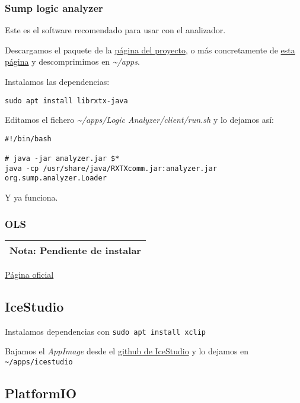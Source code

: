 \documentclass[
  12pt,
  spanish,
]{article}
\begin{document}
\hypertarget{sump-logic-analyzer}{%
\subsubsection{Sump logic analyzer}\label{sump-logic-analyzer}}

Este es el software recomendado para usar con el analizador.

Descargamos el paquete de la \href{https://www.sump.org}{página del
proyecto}, o más concretamente de
\href{https://www.sump.org/projects/analyzer/}{esta página} y
descomprimimos en \emph{\textasciitilde/apps}.

Instalamos las dependencias:

\begin{verbatim}
sudo apt install librxtx-java
\end{verbatim}

Editamos el fichero \emph{\textasciitilde/apps/Logic
Analyzer/client/run.sh} y lo dejamos así:

\begin{verbatim}
#!/bin/bash

# java -jar analyzer.jar $*
java -cp /usr/share/java/RXTXcomm.jar:analyzer.jar org.sump.analyzer.Loader
\end{verbatim}

Y ya funciona.

\hypertarget{ols}{%
\subsubsection{OLS}\label{ols}}

\begin{longtable}[]{@{}l@{}}
\toprule
\endhead
\textbf{Nota}: Pendiente de instalar\tabularnewline
\bottomrule
\end{longtable}

\href{https://www.lxtreme.nl/ols/}{Página oficial}

\hypertarget{icestudio}{%
\subsection{IceStudio}\label{icestudio}}

Instalamos dependencias con \texttt{sudo\ apt\ install\ xclip}

Bajamos el \emph{AppImage} desde el
\href{https://github.com/FPGAwars/icestudio}{github de IceStudio} y lo
dejamos en \texttt{\textasciitilde{}/apps/icestudio}

\hypertarget{platformio}{%
\subsection{PlatformIO}\label{platformio}}
\end{document}
